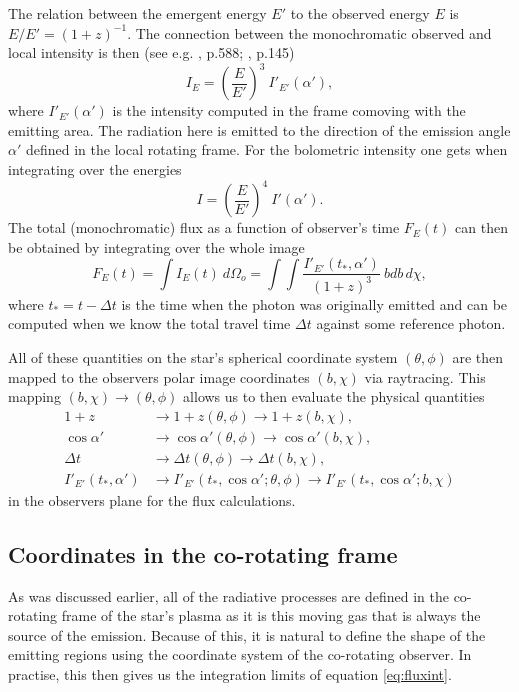 \documentclass[iop, usenatbib]{emulateapj}
\newcommand{\be}{\begin{equation}}
\newcommand{\ee}{\end{equation}}
\newcommand{\red}[1]{\textcolor{red}{#1}}
\begin{document}
The relation between the emergent energy $E'$ to the observed energy $E$ is $E/E' = (1 + z)^{-1}$.
The connection between the monochromatic observed and local intensity is then (see e.g. \citealt{MTW73}, p.588; \citealt{RL79}, p.145)
\be
I_E = \left( \frac{E}{E'} \right)^3 ~I'_{E'}(\alpha'),
\ee
where $I'_{E'}(\alpha')$ is the intensity computed in the frame comoving with the emitting area.
The radiation here is emitted to the direction of the emission angle $\alpha'$ defined in the local rotating frame.
For the bolometric intensity one gets when integrating over the energies
\be
I = \left(\frac{E}{E'} \right)^4 ~I'(\alpha').
\ee
The total (monochromatic) flux as a function of observer's time $F_E(t)$ can then be obtained by integrating over the whole image
\be\label{eq:fluxint}
F_E(t) = \int I_{E}(t) ~d\Omega_o = \int\int \frac{I'_{E'}(t_*, \alpha')}{(1+z)^3}  ~bdb \, d\chi,
\ee
where $t_* = t - \Delta t$ is the time when the photon was originally emitted and can be computed when we know the total travel time $\Delta t$ against some reference photon. %

All of these quantities on the star's spherical coordinate system $(\theta, \phi)$ are then mapped to the observers polar image coordinates $(b, \chi)$ via raytracing.
This mapping $(b, \chi) \rightarrow (\theta, \phi)$ allows us to then evaluate the physical quantities
\begin{align}
1+z                  &\rightarrow 1+z(\theta, \phi) \rightarrow 1+z(b, \chi), \\
\cos\alpha'          &\rightarrow \cos\alpha'(\theta, \phi) \rightarrow \cos\alpha'(b, \chi), \\
\Delta t             &\rightarrow \Delta t(\theta, \phi) \rightarrow \Delta t(b, \chi), \\
I'_{E'}(t_*, \alpha') &\rightarrow I'_{E'}(t_*, \cos\alpha'; \theta, \phi) \rightarrow I'_{E'}(t_*, \cos\alpha'; b, \chi)
\end{align}
in the observers plane for the flux calculations.

\subsection{Coordinates in the co-rotating frame}
As was discussed earlier, all of the radiative processes are defined in the co-rotating frame of the star's plasma as it is this moving gas that is always the source of the emission.
Because of this, it is natural to define the shape of the emitting regions using the coordinate system of the co-rotating observer.
In practise, this then gives us the integration limits of equation \eqref{eq:fluxint}.
\end{document}
